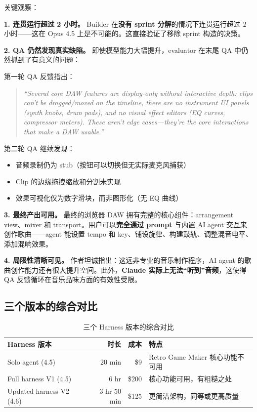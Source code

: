 \documentclass[a4paper]{article}
\begin{document}
关键观察：

\textbf{1. 连贯运行超过 2 小时。} Builder 在\textbf{没有 sprint 分解}的情况下连贯运行超过 2 小时——这在 Opus 4.5 上是不可能的。这直接验证了移除 sprint 构造的决策。

\textbf{2. QA 仍然发现真实缺陷。} 即使模型能力大幅提升，evaluator 在末尾 QA 中仍然抓到了有意义的问题：

第一轮 QA 反馈指出：
\begin{quote}
\textit{``Several core DAW features are display-only without interactive depth: clips can't be dragged/moved on the timeline, there are no instrument UI panels (synth knobs, drum pads), and no visual effect editors (EQ curves, compressor meters). These aren't edge cases---they're the core interactions that make a DAW usable.''}
\end{quote}

第二轮 QA 继续发现：
\begin{itemize}[leftmargin=1.5em]
    \item 音频录制仍为 stub（按钮可以切换但无实际麦克风捕获）
    \item Clip 的边缘拖拽缩放和分割未实现
    \item 效果可视化仅为数字滑块，而非图形化（无 EQ 曲线）
\end{itemize}

\textbf{3. 最终产出可用。} 最终的浏览器 DAW 拥有完整的核心组件：arrangement view、mixer 和 transport。用户可以\textbf{完全通过 prompt} 与内置 AI agent 交互来创作歌曲——agent 能设置 tempo 和 key、铺设旋律、构建鼓轨、调整混音电平、添加混响效果。

\textbf{4. 局限性清晰可见。} 作者坦诚指出：这远非专业的音乐制作程序，AI agent 的歌曲创作能力还有很大提升空间。此外，\textbf{Claude 实际上无法``听到''音频}，这使得 QA 反馈循环在音乐品味方面的有效性受限。

\subsection{三个版本的综合对比}

\begin{table}[H]
\centering
\renewcommand{\arraystretch}{1.3}
\begin{tabular}{p{3.5cm}rrp{5cm}}
\toprule
\textbf{Harness 版本} & \textbf{时长} & \textbf{成本} & \textbf{特点} \\
\midrule
Solo agent (4.5) & 20 min & \$9 & Retro Game Maker 核心功能不可用 \\
Full harness V1 (4.5) & 6 hr & \$200 & 核心功能可用，有粗糙之处 \\
Updated harness V2 (4.6) & 3 hr 50 min & \$125 & 更简洁架构，同等或更高质量 \\
\bottomrule
\end{tabular}
\caption{三个 Harness 版本的综合对比}
\end{table}
\end{document}

